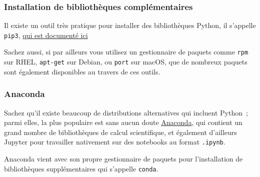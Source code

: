     \hypertarget{installation-de-bibliothuxe8ques-compluxe9mentaires}{%
\subsubsection{Installation de bibliothèques
complémentaires}\label{installation-de-bibliothuxe8ques-compluxe9mentaires}}

    Il existe un outil très pratique pour installer des bibliothèques
Python, il s'appelle \texttt{pip3},
\href{https://pypi.python.org/pypi/pip}{qui est documenté ici}

    Sachez aussi, si par ailleurs vous utilisez un gestionnaire de paquets
comme \texttt{rpm} sur RHEL, \texttt{apt-get} sur Debian, ou
\texttt{port} sur macOS, que de nombreux paquets sont également
disponibles au travers de ces outils.

    \hypertarget{anaconda}{%
\subsubsection{Anaconda}\label{anaconda}}

    Sachez qu'il existe beaucoup de distributions alternatives qui incluent
Python~; parmi elles, la plus populaire est sans aucun doute
\href{https://www.anaconda.com/}{Anaconda}, qui contient un grand nombre
de bibliothèques de calcul scientifique, et également d'ailleurs Jupyter
pour travailler nativement sur des notebooks au format \texttt{.ipynb}.

Anaconda vient avec son propre gestionnaire de paquets pour
l'installation de bibliothèques supplémentaires qui s'appelle
\texttt{conda}.


    
    
    
